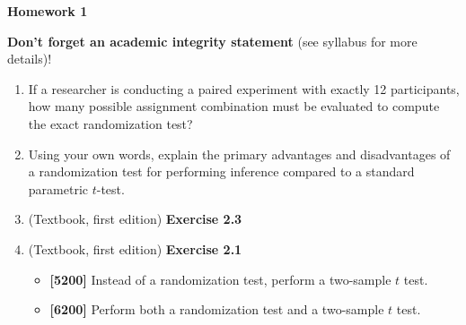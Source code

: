 \documentclass[10pt,twoside]{article}\usepackage[]{graphicx}\usepackage[dvipsnames,svgnames,table]{xcolor}
\begin{document}
\begin{flushright}
\begin{minipage}{.33\textwidth}
\rightline{\today}
\end{minipage}
\end{flushright}

\begin{center}
{\large{\textbf{Homework 1}}}
\end{center}

\textbf{Don't forget an academic integrity statement} (see syllabus for more details)!

\begin{enumerate}
    \item If a researcher is conducting a paired experiment with exactly 12 participants, how many possible assignment combination must be evaluated to compute the exact randomization test?
    \item Using your own words, explain the primary advantages and disadvantages of a randomization test for performing inference compared to a standard parametric $t$-test.
    \item (Textbook, first edition) \textbf{Exercise 2.3}
    \item (Textbook, first edition) \textbf{Exercise 2.1}
    \begin{itemize}
      \item \textbf{[5200]} Instead of a randomization test, perform a two-sample $t$ test.
      \item \textbf{[6200]} Perform both a randomization test and a two-sample $t$ test.
    \end{itemize}
    
\end{enumerate}
\end{document}
